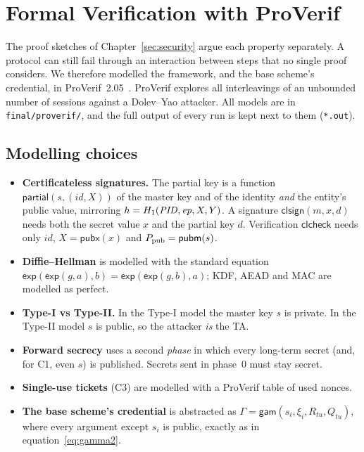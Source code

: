 \chapter{Formal Verification with ProVerif}\label{ch:pv}
The proof sketches of Chapter~\ref{sec:security} argue each property separately. A protocol can still fail through an interaction between steps that no
single proof considers. We therefore modelled the framework, and the base scheme's credential, in ProVerif~2.05~\cite{proverif,proverifbook}. ProVerif
explores all interleavings of an unbounded number of sessions against a Dolev--Yao attacker. All models are in \texttt{final/proverif/}, and the full
output of every run is kept next to them (\texttt{*.out}).

\section{Modelling choices}
\begin{itemize}
  \item \textbf{Certificateless signatures.} The partial key is a function $\mathsf{partial}(s,(\mathit{id},X))$ of the master key and of the identity
        \emph{and} the entity's public value, mirroring $h=H_1(\mathit{PID},\mathit{ep},X,Y)$. A signature $\mathsf{clsign}(m,x,d)$ needs both the secret value $x$ and the partial
        key $d$. Verification $\mathsf{clcheck}$ needs only $\mathit{id}$, $X=\mathsf{pubx}(x)$ and $P_{\mathrm{pub}}=\mathsf{pubm}(s)$.
  \item \textbf{Diffie--Hellman} is modelled with the standard equation $\mathsf{exp}(\mathsf{exp}(g,a),b)=\mathsf{exp}(\mathsf{exp}(g,b),a)$; KDF, AEAD and MAC
        are modelled as perfect.
  \item \textbf{Type-I vs Type-II.} In the Type-I model the master key $s$ is private. In the Type-II model $s$ is public, so the attacker \emph{is} the TA.
  \item \textbf{Forward secrecy} uses a second \emph{phase} in which every long-term secret (and, for C1, even $s$) is published. Secrets sent in phase~0
        must stay secret.
  \item \textbf{Single-use tickets} (C3) are modelled with a ProVerif table of used nonces.
  \item \textbf{The base scheme's credential} is abstracted as $\Gamma=\mathsf{gam}(s_i,\xi_i,R_{tu},Q_{tu})$, where every argument except $s_i$ is public, exactly
        as in equation~\eqref{eq:gamma2}.
\end{itemize}

